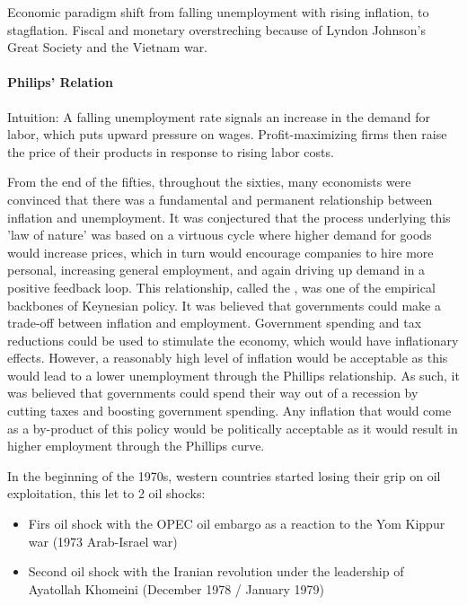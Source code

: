 \vspace{1\baselineskip}

Economic paradigm shift from falling unemployment with rising inflation,
to stagflation. Fiscal and monetary overstreching because of Lyndon Johnson's
Great Society and the Vietnam war.

\paragraph{Philips' Relation}
Intuition: A falling unemployment rate signals an increase in the demand
for labor, which puts upward pressure on wages. Profit-maximizing firms then
raise the price of their products in response to rising labor costs.

\vspace{1\baselineskip}

From the end of the fifties, throughout the sixties, many economists were
convinced that there was a fundamental and permanent relationship between
inflation and unemployment. It was conjectured that the process underlying
this 'law of nature' was based on a virtuous cycle where higher demand for
goods would increase prices, which in turn would encourage companies to hire
more personal, increasing general employment, and again driving up demand
in a positive feedback loop. This relationship, called the , was one of the empirical backbones of Keynesian policy. It was believed
that governments could make a trade-off between inflation and employment.
Government spending and tax reductions could be used to stimulate the economy,
which would have inflationary effects. However, a reasonably high level of
inflation would be acceptable as this would lead to a lower unemployment through
the Phillips relationship. As such, it was believed that governments could
spend their way out of a recession by cutting taxes and boosting government
spending. Any inflation that would come as a by-product of this policy would
be politically acceptable as it would result in higher employment through
the Phillips curve.

\vspace{1\baselineskip}

In the beginning of the 1970s, western countries started losing their grip
on oil exploitation, this let to 2 oil shocks:
\begin{itemize}
    \item Firs oil shock with the OPEC oil embargo as a reaction to the
        Yom Kippur war (1973 Arab-Israel war)
    \item Second oil shock with the Iranian revolution under the leadership
        of Ayatollah Khomeini (December 1978 / January 1979)
\end{itemize}

